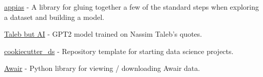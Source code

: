 \begin{cventries}
\vspace{-\baselineskip}

\cventry{}{}{}{}
{
    \begin{cvitems}
    \item \href{https://github.com/aglove2189/appias}{\faExternalLink\acvHeaderIconSep appias}{ - A library for gluing together a few of the standard steps when exploring a dataset and building a model.}
    \item \href{https://twitter.com/taleb_gpt2}{\faTwitter\acvHeaderIconSep Taleb but AI}{ - GPT2 model trained on Nassim Taleb's quotes.}
    \item \href{https://github.com/aglove2189/cookiecutter_ds}{\faExternalLink\acvHeaderIconSep cookiecutter\_ds}{ - Repository template for starting data science projects.}
    \item \href{https://github.com/aglove2189/awair}{\faExternalLink\acvHeaderIconSep Awair}{ - Python library for viewing / downloading Awair data.}
    \end{cvitems}
}

\end{cventries}
